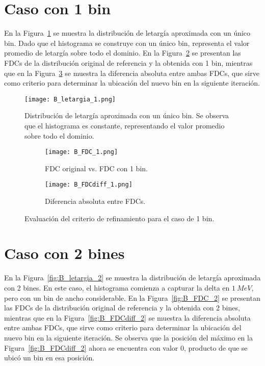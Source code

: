 \section*{Caso con 1 bin}

En la Figura~\ref{fig:B_letargia_1} se muestra la distribución de letargía aproximada con un único bin. Dado que el histograma se construye con un único bin, representa el valor promedio de letargía sobre todo el dominio. En la Figura~\ref{fig:B_FDC_1} se presentan las FDCs de la distribución original de referencia y la obtenida con 1 bin, mientras que en la Figura~\ref{fig:B_FDCdiff_1} se muestra la diferencia absoluta entre ambas FDCs, que sirve como criterio para determinar la ubicación del nuevo bin en la siguiente iteración.

\begin{figure}[H]
    \centering
    \texttt{[image: B\_letargia\_1.png]}
    \caption{Distribución de letargía aproximada con un único bin. Se observa que el histograma es constante, representando el valor promedio sobre todo el dominio.}
    \label{fig:B_letargia_1}
\end{figure}

\begin{figure}[H]
    \centering
    \begin{subfigure}[b]{0.46\textwidth}
        \texttt{[image: B\_FDC\_1.png]}
        \caption{FDC original vs. FDC con 1 bin.}
        \label{fig:B_FDC_1}
    \end{subfigure}
    \hfill
    \begin{subfigure}[b]{0.46\textwidth}
        \texttt{[image: B\_FDCdiff\_1.png]}
        \caption{Diferencia absoluta entre FDCs.}
        \label{fig:B_FDCdiff_1}
    \end{subfigure}
    \caption{Evaluación del criterio de refinamiento para el caso de 1 bin.}
    \label{fig:B_FDC_1_1}
\end{figure}

\section*{Caso con 2 bines}

En la Figura~\ref{fig:B_letargia_2} se muestra la distribución de letargía aproximada con 2 bines. En este caso, el histograma comienza a capturar la delta en $1~MeV$, pero con un bin de ancho considerable. En la Figura~\ref{fig:B_FDC_2} se presentan las FDCs de la distribución original de referencia y la obtenida con 2 bines, mientras que en la Figura~\ref{fig:B_FDCdiff_2} se muestra la diferencia absoluta entre ambas FDCs, que sirve como criterio para determinar la ubicación del nuevo bin en la siguiente iteración. Se observa que la posición del máximo en la Figura~\ref{fig:B_FDCdiff_2} ahora se encuentra con valor 0, producto de que se ubicó un bin en esa posición.

